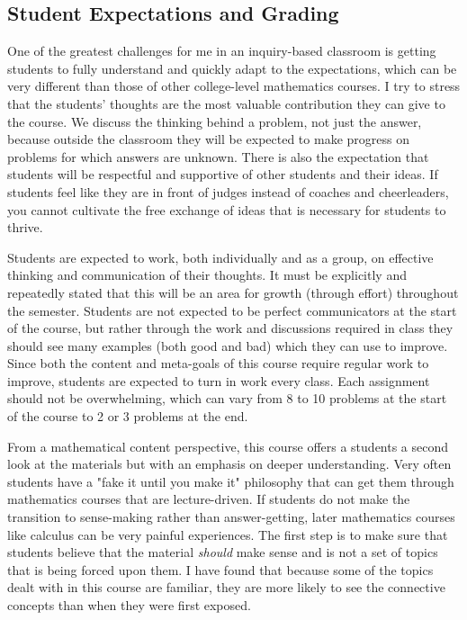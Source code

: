 \begin{annotation}
\subsection{Student Expectations and Grading}
One of the greatest challenges for me in an inquiry-based classroom is getting students to fully understand and quickly adapt to the expectations, which can be very different than those of other college-level mathematics courses. I try to stress that the students' thoughts are the most valuable contribution they can give to the course. We discuss the thinking behind a problem, not just the answer, because outside the classroom they will be expected to make progress on problems for which answers are unknown. There is also the expectation that students will be respectful and supportive of other students and their ideas. If students feel like they are in front of judges instead of coaches and cheerleaders, you cannot cultivate the free exchange of ideas that is necessary for students to thrive.

Students are expected to work, both individually and as a group, on effective thinking and communication of their thoughts. It must be explicitly and repeatedly stated that this will be an area for growth (through effort) throughout the semester. Students are not expected to be perfect communicators at the start of the course, but rather through the work and discussions required in class they should see many examples (both good and bad) which they can use to improve. Since both the content and meta-goals of this course require regular work to improve, students are expected to turn in work every class. Each assignment should not be overwhelming, which can vary from 8 to 10 problems at the start of the course to 2 or 3 problems at the end.

From a mathematical content perspective, this course offers a students a second look at the materials but with an emphasis on deeper understanding. Very often students have a "fake it until you make it" philosophy that can get them through mathematics courses that are lecture-driven. If students do not make the transition to sense-making rather than answer-getting, later mathematics courses like calculus can be very painful experiences. The first step is to make sure that students believe that the material \emph{should} make sense and is not a set of topics that is being forced upon them. I have found that because some of the topics dealt with in this course are familiar, they are more likely to see the connective concepts than when they were first exposed.


\end{annotation}
